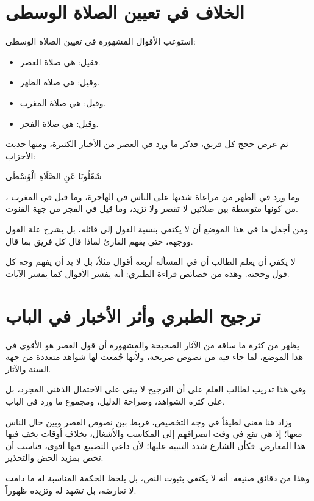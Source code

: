 \section{الخلاف في تعيين الصلاة الوسطى}
استوعب  الأقوال المشهورة في تعيين الصلاة الوسطى:
\begin{itemize}
    \item فقيل: هي صلاة العصر.
    \item وقيل: هي صلاة الظهر.
    \item وقيل: هي صلاة المغرب.
    \item وقيل: هي صلاة الفجر.
\end{itemize}

ثم عرض حجج كل فريق، فذكر ما ورد في العصر من الأخبار الكثيرة، ومنها حديث الأحزاب: \begin{ayah}شَغَلُونَا عَنِ الصَّلَاةِ الْوُسْطَى\end{ayah}، وما ورد في الظهر من مراعاة شدتها على الناس في الهاجرة، وما قيل في المغرب من كونها متوسطة بين صلاتين لا تقصر ولا تزيد، وما قيل في الفجر من جهة القنوت.

ومن أجمل ما في هذا الموضع أن  لا يكتفي بنسبة القول إلى قائله، بل يشرح علة القول ووجهه، حتى يفهم القارئ لماذا قال كل فريق بما قال.

\begin{fawaid}
لا يكفي أن يعلم الطالب أن في المسألة أربعة أقوال مثلاً، بل لا بد أن يفهم وجه كل قول وحجته. وهذه من خصائص قراءة الطبري: أنه يفسر الأقوال كما يفسر الآيات.
\end{fawaid}

\section{ترجيح الطبري وأثر الأخبار في الباب}
يظهر من كثرة ما ساقه  من الآثار الصحيحة والمشهورة أن قول العصر هو الأقوى في هذا الموضع، لما جاء فيه من نصوص صريحة، ولأنها جُمعت لها شواهد متعددة من جهة السنة والآثار.

وفي هذا تدريب لطالب العلم على أن الترجيح لا يبنى على الاحتمال الذهني المجرد، بل على كثرة الشواهد، وصراحة الدليل، ومجموع ما ورد في الباب.

وزاد  هنا معنى لطيفاً في وجه التخصيص، فربط بين نصوص العصر وبين حال الناس معها؛ إذ هي تقع في وقت انصرافهم إلى المكاسب والأشغال، بخلاف أوقات يخف فيها هذا المعارض. فكأن الشارع شدد التنبيه عليها؛ لأن داعي التضييع فيها أقوى، فناسب أن تخص بمزيد الحض والتحذير.

وهذا من دقائق صنيعه: أنه لا يكتفي بثبوت النص، بل يلحظ الحكمة المناسبة له ما دامت لا تعارضه، بل تشهد له وتزيده ظهوراً.

